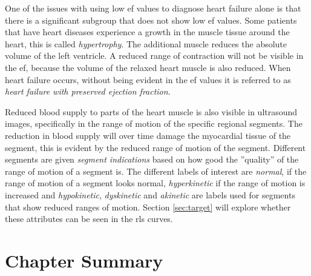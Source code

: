 One of the issues with using low \acrshort{ef} values to diagnose heart failure alone is that there is a significant subgroup that does not show low \acrshort{ef} values. Some patients that have heart diseases experience a growth in the muscle tissue around the heart, this is called \textit{hypertrophy}. The additional muscle reduces the absolute volume of the left ventricle. A reduced range of contraction will not be visible in the \acrshort{ef}, because the volume of the relaxed heart muscle is also reduced. When heart failure occurs, without being evident in the \acrshort{ef} values it is referred to as \textit{heart failure with preserved ejection fraction}. \bigskip

Reduced blood supply to parts of the heart muscle is also visible in ultrasound images, specifically in the range of motion of the specific regional segments. The reduction in blood supply will over time damage the myocardial tissue of the segment, this is evident by the reduced range of motion of the segment. Different segments are given \textit{segment indications} based on how good the ''quality'' of the range of motion of a segment is. The different labels of interest are \textit{normal}, if the range of motion of a segment looks normal, \textit{hyperkinetic} if the range of motion is increased and \textit{hypokinetic}, \textit{dyskinetic} and \textit{akinetic} are labels used for segments that show reduced ranges of motion. Section \ref{sec:target} will explore whether these attributes can be seen in the \acrshort{rls} curves.

\section{Chapter Summary}

